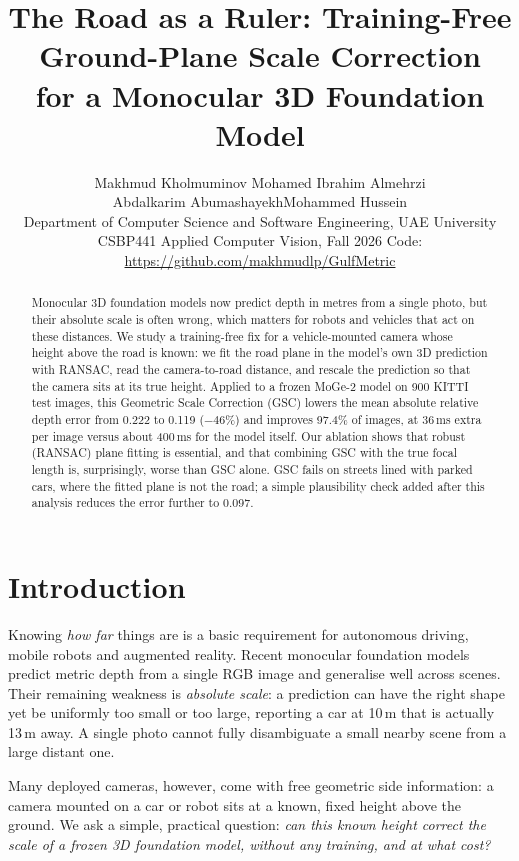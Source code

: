 \documentclass[10pt,twocolumn,letterpaper]{article}
\title{The Road as a Ruler: Training-Free Ground-Plane Scale Correction\\for a Monocular 3D Foundation Model}
\author{Makhmud Kholmuminov \qquad Mohamed Ibrahim Almehrzi\\
Abdalkarim Abumashayekh\qquad Mohammed Hussein\\[2pt]
Department of Computer Science and Software Engineering, UAE University\\
{\small CSBP441 Applied Computer Vision, Fall 2026 \quad Code: \url{https://github.com/makhmudlp/GulfMetric}}}
\begin{document}
\maketitle

\begin{abstract}
Monocular 3D foundation models now predict depth in metres from a single photo, but their absolute
scale is often wrong, which matters for robots and vehicles that act on these distances. We study a
training-free fix for a vehicle-mounted camera whose height above the road is known: we fit the road
plane in the model's own 3D prediction with RANSAC, read the camera-to-road distance, and rescale the
prediction so that the camera sits at its true height. Applied to a frozen MoGe-2 model on 900 KITTI
test images, this Geometric Scale Correction (GSC) lowers the mean absolute relative depth error from
0.222 to 0.119 ($-46\%$) and improves 97.4\% of images, at 36\,ms extra per image versus about 400\,ms
for the model itself. Our ablation shows that robust (RANSAC) plane fitting is essential, and that
combining GSC with the true focal length is, surprisingly, worse than GSC alone. GSC fails on streets
lined with parked cars, where the fitted plane is not the road; a simple plausibility check added after
this analysis reduces the error further to 0.097.
\end{abstract}

\section{Introduction}
\label{sec:intro}

Knowing \emph{how far} things are is a basic requirement for autonomous driving, mobile robots and
augmented reality. Recent monocular foundation models~\cite{yin2023metric3d,piccinelli2024unidepth,
bochkovskii2025depthpro,wang2025moge2} predict metric depth from a single RGB image and generalise
well across scenes. Their remaining weakness is \emph{absolute scale}: a prediction can have the right
shape yet be uniformly too small or too large, \eg reporting a car at 10\,m that is actually 13\,m
away. A single photo cannot fully disambiguate a small nearby scene from a large distant one.

Many deployed cameras, however, come with free geometric side information: a camera mounted on a car
or robot sits at a known, fixed height above the ground. We ask a simple, practical question:
\emph{can this known height correct the scale of a frozen 3D foundation model, without any training,
and at what cost?}
\end{document}
